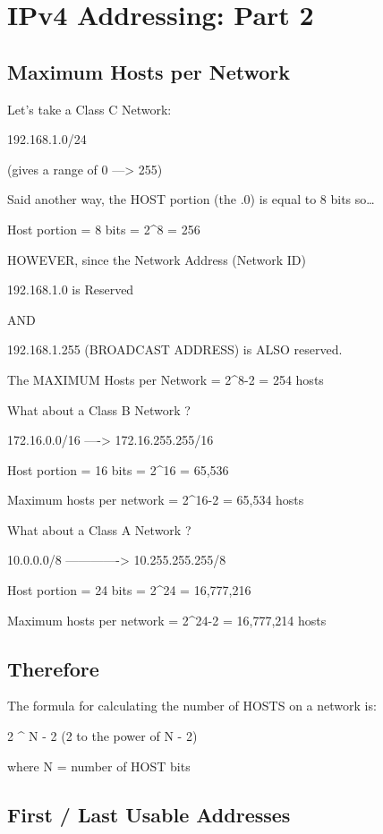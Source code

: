 \chapter{IPv4 Addressing: Part 2}\label{ipv4-addressing-part-2}

\section{Maximum Hosts per Network}\label{maximum-hosts-per-network}

Let's take a Class C Network:

192.168.1.0/24

(gives a range of 0 ---\textgreater{} 255)

Said another way, the HOST portion (the .0) is equal to 8 bits
so\ldots{}

Host portion = 8 bits = 2\^{}8 = 256

HOWEVER, since the Network Address (Network ID)

192.168.1.0 is Reserved

AND

192.168.1.255 (BROADCAST ADDRESS) is ALSO reserved.

The MAXIMUM Hosts per Network = 2\^{}8-2 = 254 hosts

What about a Class B Network ?

172.16.0.0/16 ----\textgreater{} 172.16.255.255/16

Host portion = 16 bits = 2\^{}16 = 65,536

Maximum hosts per network = 2\^{}16-2 = 65,534 hosts

What about a Class A Network ?

10.0.0.0/8 -------------\textgreater{} 10.255.255.255/8

Host portion = 24 bits = 2\^{}24 = 16,777,216

Maximum hosts per network = 2\^{}24-2 = 16,777,214 hosts

\section{Therefore}\label{therefore}

The formula for calculating the number of HOSTS on a network is:

2 \^{} N - 2 (2 to the power of N - 2)

where N = number of HOST bits

\section{First / Last Usable
Addresses}\label{first-last-usable-addresses}

